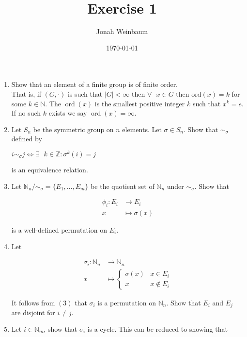 \documentclass{article}
\begin{document}
\title{Exercise 1}
\author{Jonah Weinbaum}
\date{\today}
\maketitle

\begin{enumerate}
    \item Show that an element of a finite group is of finite order. 
        \\That is, if $(G, \cdot)$ is such that $|G| < \infty$ then $\forall\text{ }x\in{G}$ then $\text{ord}(x) = k$ for some $k\in\mathbb{N}$. The $\operatorname{ord}(x)$ is the smallest positive integer $k$ such that $x^k = e$. If no such $k$ exists we say $\operatorname{ord}(x) = \infty$.
    \item Let $S_n$ be the symmetric group on $n$ elements. Let $\sigma\in S_n$. Show that $\sim_{\sigma}$ defined by 
    \begin{center}
        $i\sim_\sigma j \iff \exists\text{ }k\in\mathbb{Z}\colon\sigma^k(i)=j$
    \end{center}
    is an equivalence relation.
    \item Let $\mathbb{N}_n/\sim_\sigma = \{E_1,\dots,E_m\}$ be the quotient set of $\mathbb{N}_n$ under $\sim_\sigma$. Show that 
    \begin{center}
    \begin{align*}
        \phi_i: E_i &\rightarrow E_i
        \\x &\mapsto \sigma(x)
    \end{align*}
    \end{center}
    is a well-defined permutation on $E_i$.
    \item Let 
    \begin{center}
    \begin{align*}
        \sigma_i: \mathbb{N}_n &\rightarrow \mathbb{N}_n
        \\x &\mapsto \begin{cases} 
      \sigma(x) & x\in E_i \\
      x & x\notin E_i
    \end{cases}
    \end{align*}
    \end{center}
    It follows from $(3)$ that $\sigma_i$ is a permutation on $\mathbb{N}_n$. Show that $E_i$ and $E_j$ are disjoint for $i\ne j$.
    \item Let $i\in\mathbb{N}_m$, show that $\sigma_i$ is a cycle. This can be reduced to showing that
    \begin{center}

\end{center}
\end{enumerate}
\end{document}

